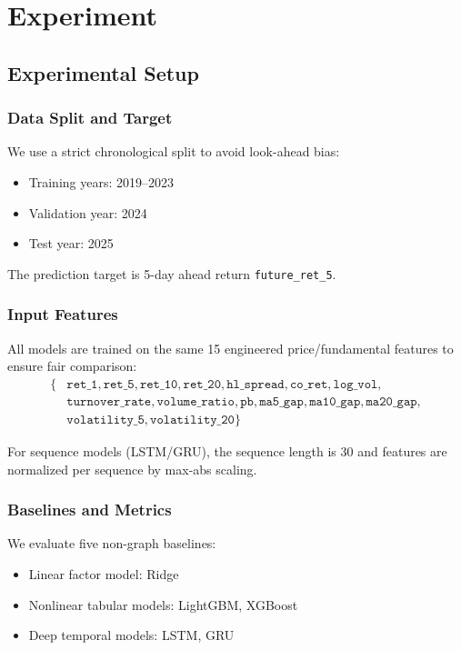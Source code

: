 \chapter{Experiment}

\section{Experimental Setup}

\subsection{Data Split and Target}
We use a strict chronological split to avoid look-ahead bias:
\begin{itemize}
	\item Training years: 2019--2023
	\item Validation year: 2024
	\item Test year: 2025
\end{itemize}

The prediction target is 5-day ahead return \texttt{future\_ret\_5}.

\subsection{Input Features}
All models are trained on the same 15 engineered price/fundamental features to ensure fair comparison:
\begin{align*}
\{&\texttt{ret\_1},\texttt{ret\_5},\texttt{ret\_10},\texttt{ret\_20},\texttt{hl\_spread},\texttt{co\_ret},\texttt{log\_vol},\\
&\texttt{turnover\_rate},\texttt{volume\_ratio},\texttt{pb},\texttt{ma5\_gap},\texttt{ma10\_gap},\texttt{ma20\_gap},\\
&\texttt{volatility\_5},\texttt{volatility\_20}\}
\end{align*}

For sequence models (LSTM/GRU), the sequence length is 30 and features are normalized per sequence by max-abs scaling.

\subsection{Baselines and Metrics}
We evaluate five non-graph baselines:
\begin{itemize}
	\item Linear factor model: Ridge
	\item Nonlinear tabular models: LightGBM, XGBoost
	\item Deep temporal models: LSTM, GRU
\end{itemize}

